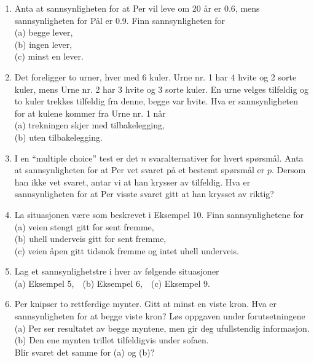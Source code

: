\begin{enumerate}
\item  Anta at sannsynligheten for at Per vil leve om 20 år er 0.6,
     mens sannsynligheten for Pål er 0.9. Finn sannsynligheten for  \\
     (a)  begge lever,\\
     (b)  ingen lever,\\
     (c)  minst en lever.

\item  Det foreligger to urner, hver med 6 kuler. Urne nr. 1 har 4
     hvite og 2 sorte kuler, mens Urne nr. 2 har 3 hvite og 3
     sorte kuler. En urne velges tilfeldig og to kuler trekkes
     tilfeldig fra denne, begge var hvite. Hva er sannsynligheten
     for at kulene kommer fra Urne nr. 1 når \\
     (a)  trekningen skjer med tilbakelegging,\\
     (b)  uten tilbakelegging.

\item  I en ``multiple choice'' test er det $n$ svaralternativer
     for hvert spørsmål. Anta at sannsynligheten for at Per vet
     svaret på et bestemt spørsmål er $p$. Dersom han ikke vet
     svaret, antar vi at han krysser av tilfeldig. Hva er
     sannsynligheten for at Per visste svaret gitt at han krysset
     av riktig?

\item  La situasjonen være som beskrevet i Eksempel 10. Finn
     sannsynlighetene for \\
     (a)  veien stengt gitt for sent fremme,\\
     (b)  uhell underveis gitt for sent fremme,\\
     (c)  veien åpen gitt tidsnok fremme og intet uhell
     underveis.

\item  Lag et sannsynlighetstre i hver av følgende situasjoner \\
     (a) Eksempel 5,\mbox{\ \ }(b) Eksempel 6,\mbox{\ \ }(c) Eksempel 9.

\item  Per knipser to rettferdige mynter. Gitt at minst en viste
     kron. Hva er sannsynligheten for at begge viste kron?
     Løs oppgaven under forutsetningene \\
     (a)  Per ser resultatet av begge myntene, men gir deg     
     ufullstendig informasjon. \\
     (b)  Den ene mynten trillet tilfeldigvis under sofaen. \\
     Blir svaret det samme for (a) og (b)?


\end{enumerate}
